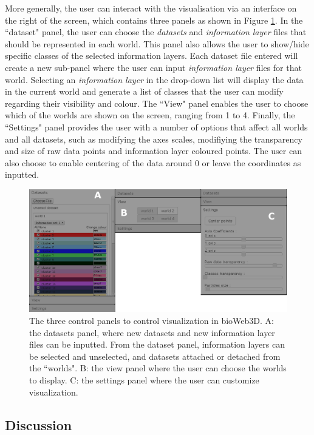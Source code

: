 	More generally, the user can interact with the visualisation via an interface on the right of the screen, which contains three panels as shown in Figure \ref{fig:panels}. In the ``dataset" panel, the user can choose the {\it{datasets}} and {\it{information layer}} files that should be represented in each world. This panel also allows the user to show/hide specific classes of the selected information layers. Each dataset file entered will create a new sub-panel where the user can input {\it{information layer}} files for that world. Selecting an {\it{information layer}} in the drop-down list will display the data in the current world and generate a list of classes that the user can modify regarding their visibility and colour. The ``View" panel enables the user to choose which of the worlds are shown on the screen, ranging from 1 to 4. Finally, the ``Settings" panel provides the user with a number of options that affect all worlds and all datasets, such as modifying the axes scales, modifiying the transparency and size of raw data points and information layer coloured points. The user can also choose to enable centering of the data around 0 or leave the coordinates as inputted.\\
	
	\begin{figure}[h]
\centerline{\includegraphics[width=\linewidth]{gfx/chapter3/panels.png}}
\caption{The three control panels to control visualization in bioWeb3D. A: the datasets panel, where new datasets and new information layer files can be inputted. From the dataset panel, information layers can be selected and unselected, and datasets attached or detached from the ``worlds". B: the view panel where the user can choose the worlds to display. C: the settings panel where the user can customize visualization.}\label{fig:panels}
	\end{figure}

	\subsection{Discussion}

